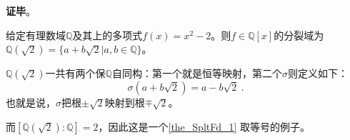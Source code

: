 













\textbf{证毕}。





\begin{example}{}

给定有理数域$\mathbb{Q}$及其上的多项式$f(x)=x^2-2$。则$f\in\mathbb{Q}[x]$的分裂域为$\mathbb{Q}(\sqrt{2})=\{a+b\sqrt{2}|a, b\in\mathbb{Q}\}$。

$\mathbb{Q}(\sqrt{2})$一共有两个保$\mathbb{Q}$自同构：第一个就是恒等映射，第二个$\sigma$则定义如下：
\begin{equation}
\sigma(a+b\sqrt{2})=a-b\sqrt{2}~.
\end{equation}
也就是说，$\sigma$把根$\pm\sqrt{2}$映射到根$\mp\sqrt{2}$。


而$[\mathbb{Q}(\sqrt{2}):\mathbb{Q}]=2$，因此这是一个\autoref{the_SpltFd_1} 取等号的例子。

\end{example}


